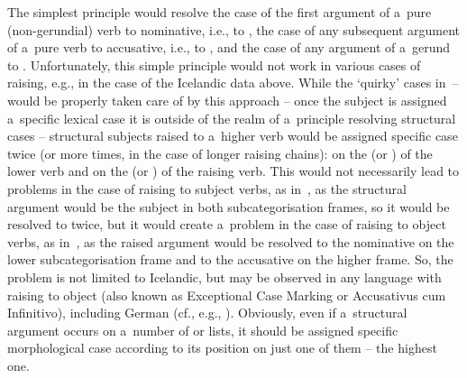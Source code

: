 \documentclass[output=paper]{langsci/langscibook}
\begin{document}
The simplest principle would resolve the case of the first  argument of a~pure (non-gerundial) verb to nominative, i.e., to , the case of any subsequent  argument of a~pure verb to accusative, i.e., to , and the case of any  argument of a~gerund to .  Unfortunately, this simple principle would not work in various cases of raising, e.g., in the case of the Icelandic data above.  While the ‘quirky’ cases in~– would be properly taken care of by this approach – once the subject is assigned a~specific lexical case it is outside of the realm of a~principle resolving structural cases – structural subjects raised to a~higher verb would be assigned specific case twice (or more times, in the case of longer raising chains): on the  (or ) of the lower verb and on the  (or ) of the raising verb.  This would not necessarily lead to problems in the case of raising to subject verbs, as in~, as the structural argument would be the subject in both subcategorisation frames, so it would be resolved to  twice, but it would create a~problem in the case of raising to object verbs, as in~, as the raised argument would be resolved to the nominative on the lower subcategorisation frame and to the accusative on the higher frame.  So, the problem is not limited to Icelandic, but may be observed in any language with raising to object (also known as Exceptional Case Marking or Accusativus cum Infinitivo), including German (cf., e.g., \citealt[231]{HM94a}).  Obviously, even if a~structural argument occurs on a~number of  or  lists, it should be assigned specific morphological case according to its position on just one of them – the highest one.
\end{document}
